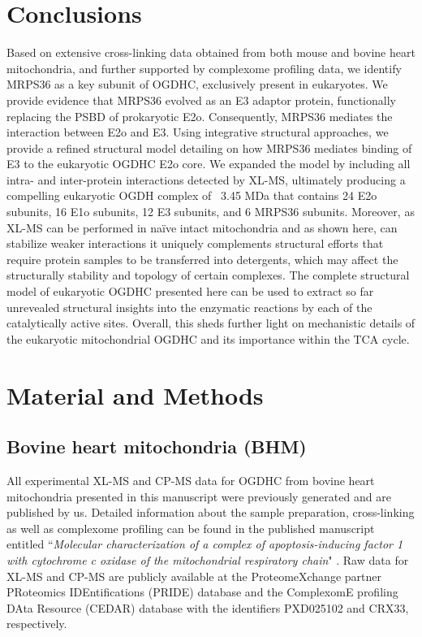 \section{Conclusions}
Based on extensive cross-linking data obtained from both mouse and bovine heart mitochondria, and further supported by complexome profiling data, we identify MRPS36 as a key subunit of OGDHC, exclusively present in eukaryotes. We provide evidence that MRPS36 evolved as an E3 adaptor protein, functionally replacing the PSBD of prokaryotic E2o. Consequently, MRPS36 mediates the interaction between E2o and E3. Using integrative structural approaches, we provide a refined structural model detailing on how MRPS36 mediates binding of E3 to the eukaryotic OGDHC E2o core. We expanded the model by including all intra- and inter-protein interactions detected by XL-MS, ultimately producing a compelling eukaryotic OGDH complex of ~3.45 MDa that contains 24 E2o subunits, 16 E1o subunits, 12 E3 subunits, and 6 MRPS36 subunits. Moreover, as XL-MS can be performed in naïve intact mitochondria and as shown here, can stabilize weaker interactions it uniquely complements structural efforts that require protein samples to be transferred into detergents, which may affect the structurally stability and topology of certain complexes. The complete structural model of eukaryotic OGDHC presented here can be used to extract so far unrevealed structural insights into the enzymatic reactions by each of the catalytically active sites. Overall, this sheds further light on mechanistic details of the eukaryotic mitochondrial OGDHC and its importance within the TCA cycle.

\section{Material and Methods}
\subsection*{Bovine heart mitochondria (BHM)}
All experimental XL-MS and CP-MS data for OGDHC from bovine heart mitochondria presented in this manuscript were previously generated and are published by us. Detailed information about the sample preparation, cross-linking as well as complexome profiling can be found in the published manuscript entitled “\emph{Molecular characterization of a complex of apoptosis-inducing factor 1 with cytochrome c oxidase of the mitochondrial respiratory chain}" \cite{Hevler_2021b}. Raw data for XL-MS and CP-MS are publicly available at the ProteomeXchange partner PRoteomics IDEntifications (PRIDE) database and the ComplexomE profiling DAta Resource (CEDAR) database with the identifiers PXD025102 and CRX33, respectively.

